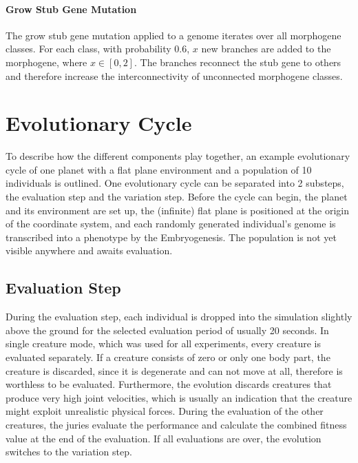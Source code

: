 \documentclass[main]{subfiles}
\begin{document}
\paragraph{Grow Stub Gene Mutation}

The grow stub gene mutation applied to a genome iterates over all morphogene classes. %
%
For each class, with probability $0.6$, $x$ new branches are added to the morphogene, where $x \in [0,2]$. %
%
The branches reconnect the stub gene to others and therefore increase the interconnectivity of unconnected morphogene classes.

\section{Evolutionary Cycle}

To describe how the different components play together, an example evolutionary cycle of one planet with a flat plane environment and a population of 10 individuals is outlined. %
%
One evolutionary cycle can be separated into 2 substeps, the evaluation step and the variation step. %
%
Before the cycle can begin, the planet and its environment are set up, the (infinite) flat plane is positioned at the origin of the coordinate system, and each randomly generated individual's genome is transcribed into a phenotype by the Embryogenesis. %
%
The population is not yet visible anywhere and awaits evaluation.

\subsection{Evaluation Step}

During the evaluation step, each individual is dropped into the simulation slightly above the ground for the selected evaluation period of usually 20 seconds. %
%
In single creature mode, which was used for all experiments, every creature is evaluated separately. %
%
If a creature consists of zero or only one body part, the creature is discarded, since it is degenerate and can not move at all, therefore is worthless to be evaluated. %
%
Furthermore, the evolution discards creatures that produce very high joint velocities, which is usually an indication that the creature might exploit unrealistic physical forces. %
%
During the evaluation of the other creatures, the juries evaluate the performance and calculate the combined fitness value at the end of the evaluation. %
%
If all evaluations are over, the evolution switches to the variation step.
\end{document}
